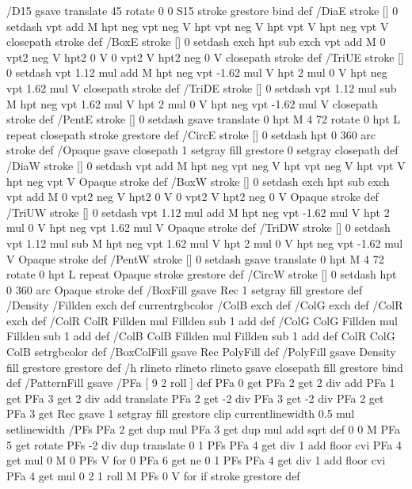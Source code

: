 /D15 {gsave translate 45 rotate 0 0 S15 stroke grestore} bind def
/DiaE {stroke [] 0 setdash vpt add M
  hpt neg vpt neg V hpt vpt neg V
  hpt vpt V hpt neg vpt V closepath stroke} def
/BoxE {stroke [] 0 setdash exch hpt sub exch vpt add M
  0 vpt2 neg V hpt2 0 V 0 vpt2 V
  hpt2 neg 0 V closepath stroke} def
/TriUE {stroke [] 0 setdash vpt 1.12 mul add M
  hpt neg vpt -1.62 mul V
  hpt 2 mul 0 V
  hpt neg vpt 1.62 mul V closepath stroke} def
/TriDE {stroke [] 0 setdash vpt 1.12 mul sub M
  hpt neg vpt 1.62 mul V
  hpt 2 mul 0 V
  hpt neg vpt -1.62 mul V closepath stroke} def
/PentE {stroke [] 0 setdash gsave
  translate 0 hpt M 4 {72 rotate 0 hpt L} repeat
  closepath stroke grestore} def
/CircE {stroke [] 0 setdash 
  hpt 0 360 arc stroke} def
/Opaque {gsave closepath 1 setgray fill grestore 0 setgray closepath} def
/DiaW {stroke [] 0 setdash vpt add M
  hpt neg vpt neg V hpt vpt neg V
  hpt vpt V hpt neg vpt V Opaque stroke} def
/BoxW {stroke [] 0 setdash exch hpt sub exch vpt add M
  0 vpt2 neg V hpt2 0 V 0 vpt2 V
  hpt2 neg 0 V Opaque stroke} def
/TriUW {stroke [] 0 setdash vpt 1.12 mul add M
  hpt neg vpt -1.62 mul V
  hpt 2 mul 0 V
  hpt neg vpt 1.62 mul V Opaque stroke} def
/TriDW {stroke [] 0 setdash vpt 1.12 mul sub M
  hpt neg vpt 1.62 mul V
  hpt 2 mul 0 V
  hpt neg vpt -1.62 mul V Opaque stroke} def
/PentW {stroke [] 0 setdash gsave
  translate 0 hpt M 4 {72 rotate 0 hpt L} repeat
  Opaque stroke grestore} def
/CircW {stroke [] 0 setdash 
  hpt 0 360 arc Opaque stroke} def
/BoxFill {gsave Rec 1 setgray fill grestore} def
/Density {
  /Fillden exch def
  currentrgbcolor
  /ColB exch def /ColG exch def /ColR exch def
  /ColR ColR Fillden mul Fillden sub 1 add def
  /ColG ColG Fillden mul Fillden sub 1 add def
  /ColB ColB Fillden mul Fillden sub 1 add def
  ColR ColG ColB setrgbcolor} def
/BoxColFill {gsave Rec PolyFill} def
/PolyFill {gsave Density fill grestore grestore} def
/h {rlineto rlineto rlineto gsave closepath fill grestore} bind def
%
%
/PatternFill {gsave /PFa [ 9 2 roll ] def
  PFa 0 get PFa 2 get 2 div add PFa 1 get PFa 3 get 2 div add translate
  PFa 2 get -2 div PFa 3 get -2 div PFa 2 get PFa 3 get Rec
  gsave 1 setgray fill grestore clip
  currentlinewidth 0.5 mul setlinewidth
  /PFs PFa 2 get dup mul PFa 3 get dup mul add sqrt def
  0 0 M PFa 5 get rotate PFs -2 div dup translate
  0 1 PFs PFa 4 get div 1 add floor cvi
	{PFa 4 get mul 0 M 0 PFs V} for
  0 PFa 6 get ne {
	0 1 PFs PFa 4 get div 1 add floor cvi
	{PFa 4 get mul 0 2 1 roll M PFs 0 V} for
 } if
  stroke grestore} def
